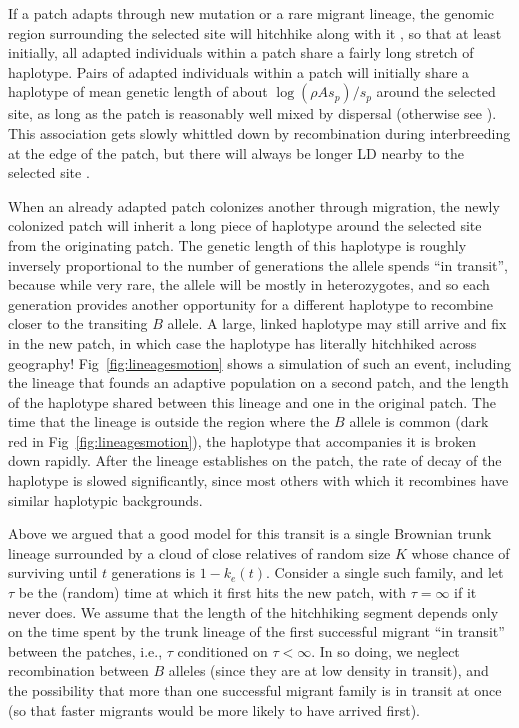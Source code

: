 \documentclass[10pt,letterpaper]{article}
\newcommand{\citep}[1]{\cite{#1}}
\newcommand{\citet}[1]{\cite{#1}}
\begin{document}
If a patch adapts through new mutation or a rare migrant lineage, the
genomic region surrounding the selected site will hitchhike along with it \citep{maynardsmith1974hitchhiking},
so that at least initially, all adapted individuals within a patch
share a fairly long stretch of haplotype. 
Pairs of adapted individuals within a patch will initially share a haplotype of mean genetic length of
about $\log(\rho A s_p)/s_p$ around the selected site, 
as long as the patch is reasonably well mixed by dispersal
(otherwise see \citet{barton2013genetic}).
This association gets slowly whittled down by recombination during interbreeding at the edge of the patch,
but there will always be longer LD nearby to the selected site \citep{barton1979geneflow}.

When an already adapted patch colonizes another through migration,
 the newly colonized patch will inherit a long piece of haplotype around the selected site from the originating patch.
The genetic length of this haplotype is roughly inversely proportional to the
number of generations the allele spends ``in transit'', 
because while very rare, the allele will be mostly in heterozygotes,
and so each generation provides another opportunity for a different haplotype to recombine closer to the transiting $B$ allele.
A large, linked haplotype may still arrive and fix in the new patch,
in which case the haplotype has literally hitchhiked across geography!
Fig~\ref{fig:lineagesmotion} shows a simulation of such an event,
including the lineage that founds an adaptive population on a second patch,
and the length of the haplotype shared between this lineage and one in the original patch.
The time that the lineage is outside the region where the $B$ allele is common (dark red in Fig~\ref{fig:lineagesmotion}), 
the haplotype that accompanies it is broken down rapidly. 
After the lineage establishes on the patch, the rate of decay of the haplotype is slowed significantly, 
since most others with which it recombines have similar haplotypic backgrounds. 


Above we argued that a good model for this transit is a single Brownian trunk lineage
surrounded by a cloud of close relatives of random size $K$
whose chance of surviving until $t$ generations is $1-k_e(t)$.
Consider a single such family, and let $\tau$ be the (random) time at which it first hits the new patch,
with $\tau = \infty$ if it never does. 
We assume that the length of the hitchhiking segment depends only on 
the time spent by the trunk lineage of the first successful migrant ``in transit'' between the patches,
i.e., $\tau$ conditioned on $\tau < \infty$.
In so doing, we neglect 
recombination between $B$ alleles (since they are at low density in transit),
and the possibility that more than one successful migrant family is in transit at once
(so that faster migrants would be more likely to have arrived first).
\end{document}
